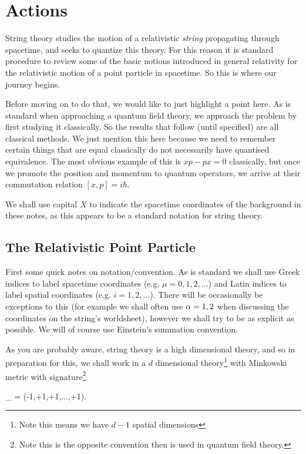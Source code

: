 \chapter{Actions}

String theory studies the motion of a relativistic \textit{string} propagating through spacetime, and seeks to quantize this theory. For this reason it is standard procedure to review some of the basic notions introduced in general relativity for the relativistic motion of a point particle in spacetime. So this is where our journey begins. 

Before moving on to do that, we would like to just highlight a point here. As is standard when approaching a quantum field theory, we approach the problem by first studying it classically. So the results that follow (until specified) are all classical methods. We just mention this here because we need to remember certain things that are equal classically do not necessarily have quantised equivalence. The most obvious example of this is $xp-px =0$ classically, but once we promote the position and momentum to quantum operators, we arrive at their commutation relation $[x,p]=i\hbar$.

We shall use capital $X$ to indicate the spacetime coordinates of the background in these notes, as this appears to be a standard notation for string theory.

\section{The Relativistic Point Particle}

First some quick notes on notation/convention. As is standard we shall use Greek indices to label spacetime coordinates (e.g. $\mu = 0,1,2,...$) and Latin indices to label spatial coordinates (e.g. $i=1,2,...$). There will be occasionally be exceptions to this (for example we shall often use $\alpha=1,2$ when discussing the coordinates on the string's worldsheet), however we shall try to be as explicit as possible. We will of course use Einstein's summation convention. 

As you are probably aware, string theory is a high dimensional theory, and so in preparation for this, we shall work in a $d$ dimensional theory\footnote{Note this means we have $d-1$ spatial dimensions} with Minkowski metric with signature\footnote{Note this is the opposite convention then is used in quantum field theory.} 

\bse 
    \eta_{\mu\nu} = \diag(-1,+1,+1,...,+1).
\ese 

